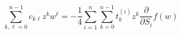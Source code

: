 \begin{equation}
\sum_{k,\ell=0}^{n-1} c_{k\ell}z^k w^{\ell}= -\frac{1}{4}
\sum_{i=1}^n \sum_{k=0}^{n-1} 
t^{(i)}_k z^k \frac{\partial}{\partial S_i} f(w)
\label{cklsolution}
\end{equation}

